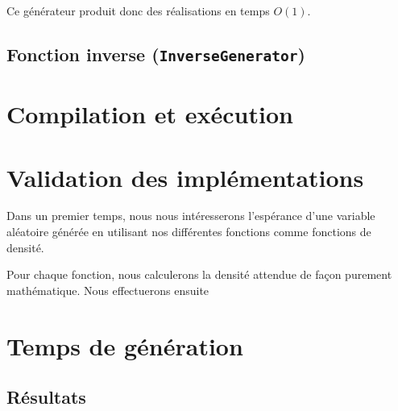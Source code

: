 \documentclass[a4paper,11pt]{article}
\begin{document}
Ce générateur produit donc des réalisations en temps $O(1)$.

\subsection{Fonction inverse {\normalfont({\tt InverseGenerator})}}

\section{Compilation et exécution}

\section{Validation des implémentations}

Dans un premier temps, nous nous intéresserons l'espérance d'une variable aléatoire générée en utilisant nos différentes fonctions comme fonctions de densité.

Pour chaque fonction, nous calculerons la densité attendue de façon purement mathématique. Nous effectuerons ensuite 

\section{Temps de génération}

\subsection{Résultats}
\end{document}
